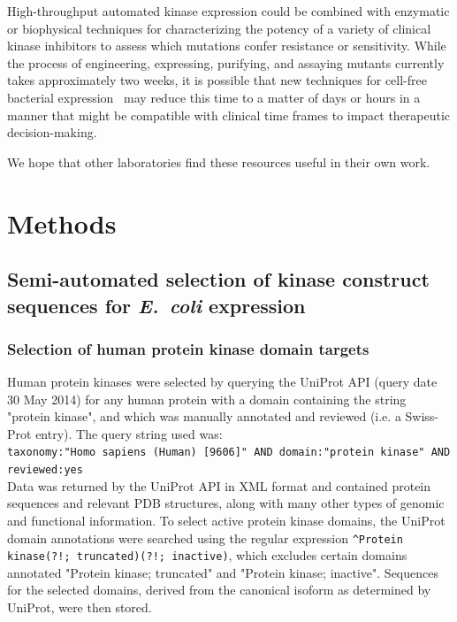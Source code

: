 \documentclass[phd,tocprelim]{cornell}
\begin{document}
High-throughput automated kinase expression could be combined with enzymatic or biophysical techniques for characterizing the potency of a variety of clinical kinase inhibitors to assess which mutations confer resistance or sensitivity.
While the process of engineering, expressing, purifying, and assaying mutants currently takes approximately two weeks, it is possible that new techniques for cell-free bacterial expression~\citep{Kim:Biotechnol.Bioeng.:1999,Sawasaki:Proc.Natl.Acad.Sci.:2002a} may reduce this time to a matter of days or hours in a manner that might be compatible with clinical time frames to impact therapeutic decision-making.

We hope that other laboratories find these resources useful in their own work.


\section{Methods}

\subsection{Semi-automated selection of kinase construct sequences for \emph{E.~coli} expression}

\subsubsection{Selection of human protein kinase domain targets}

Human protein kinases were selected by querying the UniProt API (query date 30 May 2014) for any human protein with a domain containing the string "protein kinase", and which was manually annotated and reviewed (i.e. a Swiss-Prot entry).
The query string used was:\\
{\tt taxonomy:"Homo sapiens (Human) [9606]" AND domain:"protein kinase" AND reviewed:yes}\\
Data was returned by the UniProt API in XML format and contained protein sequences and relevant PDB structures, along with many other types of genomic and functional information.
To select active protein kinase domains, the UniProt domain annotations were searched using the regular expression {\tt \^{}Protein kinase(?!; truncated)(?!; inactive)}, which excludes certain domains annotated "Protein kinase; truncated" and "Protein kinase; inactive".
Sequences for the selected domains, derived from the canonical isoform as determined by UniProt, were then stored.
\end{document}

